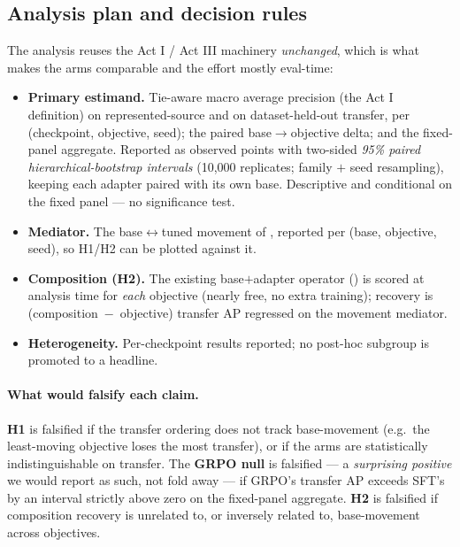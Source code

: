 \subsection{Analysis plan and decision rules}
\label{sec:actII-analysis}

The analysis reuses the Act I / Act III machinery \emph{unchanged}, which is what makes the arms
comparable and the effort mostly eval-time:
\begin{itemize}[leftmargin=1.4em,itemsep=1pt]
  \item \textbf{Primary estimand.} Tie-aware macro average precision (the Act I definition) on
  represented-source and on dataset-held-out transfer, per (checkpoint, objective, seed); the paired
  base$\to$objective delta; and the fixed-panel aggregate. Reported as observed points with two-sided
  \emph{95\% paired hierarchical-bootstrap intervals} (10{,}000 replicates; family $+$ seed resampling),
  keeping each adapter paired with its own base. Descriptive and conditional on the fixed panel --- no
  significance test.
  \item \textbf{Mediator.} The base$\leftrightarrow$tuned movement of , reported per
  (base, objective, seed), so H1/H2 can be plotted against it.
  \item \textbf{Composition (H2).} The existing base$+$adapter operator () is scored at
  analysis time for \emph{each} objective (nearly free, no extra training); recovery is
  (composition~$-$~objective) transfer AP regressed on the movement mediator.
  \item \textbf{Heterogeneity.} Per-checkpoint results reported; no post-hoc subgroup is promoted to a
  headline.
\end{itemize}

\paragraph{What would falsify each claim.} \textbf{H1} is falsified if the transfer ordering does not
track base-movement (e.g.\ the least-moving objective loses the most transfer), or if the arms are
statistically indistinguishable on transfer. The \textbf{GRPO null} is falsified --- a \emph{surprising
positive} we would report as such, not fold away --- if GRPO's transfer AP exceeds SFT's by an interval
strictly above zero on the fixed-panel aggregate. \textbf{H2} is falsified if composition recovery is
unrelated to, or inversely related to, base-movement across objectives.

